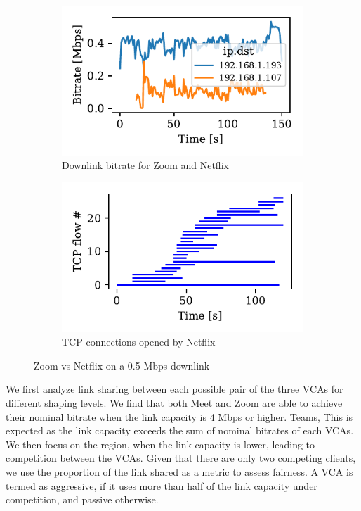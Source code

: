 \begin{figure}[t!]
\centering
\begin{subfigure}[t]{.23\textwidth}
    \centering
    \includegraphics[width=1\textwidth]{figures/comp/zoom_netflix_timeseries.pdf}
    \caption{Downlink bitrate for Zoom and Netflix}
    \label{fig:comp_zoom_netflix_bitrate}
\end{subfigure}\hfill
\begin{subfigure}[t]{.23\textwidth}
    \centering
    \includegraphics[width=1\textwidth]{figures/comp/netflix_connection_0_5.pdf}
    \caption{TCP connections opened by Netflix}
    \label{subfig:comp_netflix_conn}
\end{subfigure}
\caption{Zoom vs Netflix on a 0.5 Mbps downlink}
\label{fig:comp_netflix_zoom}
\end{figure}

We first analyze link sharing between each possible pair of the three VCAs for different shaping levels. We find that both Meet and Zoom are able to achieve their nominal bitrate when the link capacity is 4 Mbps or higher. Teams,  This is expected as the link capacity exceeds the sum of nominal bitrates of each VCAs. We then focus on the region, when the link capacity is lower, leading to competition between the VCAs. Given that there are only two competing clients, we use the proportion of the link shared as a metric to assess fairness. A VCA is termed as aggressive, if it uses more than half of the link capacity under competition, and passive otherwise. 


